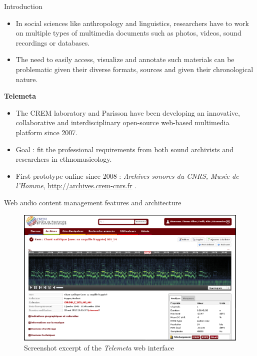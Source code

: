 \documentclass[final, hyperref, table]{beamer}
\begin{document}
\begin{frame}[containsverbatim]{}
  \begin{columns}[t]

 \begin{column}[T]{.49\linewidth}
    \begin{block}{Introduction}\small
    
      \begin{itemize}
      \item In social sciences like anthropology and linguistics,
        researchers have to work on multiple types of multimedia
        documents such as photos, videos, sound recordings or
        databases.
      \item The need to easily access, visualize and annotate
        such materials can be problematic given their diverse formats,
        sources and given their chronological nature.
      \end{itemize}
\textbf{Telemeta}\\
\begin{itemize}
\item The CREM laboratory and Parisson have been developing an innovative,
  collaborative and interdisciplinary open-source web-based multimedia
  platform since 2007.
\item Goal : fit the professional requirements from both sound archivists and
  researchers in ethnomusicology.
\item First prototype online since 2008 : \emph{Archives sonores du CNRS, Musée de
    l'Homme}, \url{http://archives.crem-cnrs.fr} .
\end{itemize}

    \end{block}

\begin{block}{Web audio content management features and architecture}\small
\begin{figure}[htbp]
  \centering
  \includegraphics[width=0.4\paperwidth]{../img/telemeta.png}
  \caption{Screenshot excerpt of the \emph{Telemeta} web interface}\label{fig:Telemeta}
\end{figure}


\end{block}
\end{column}
\end{columns}
\end{frame}
\end{document}
